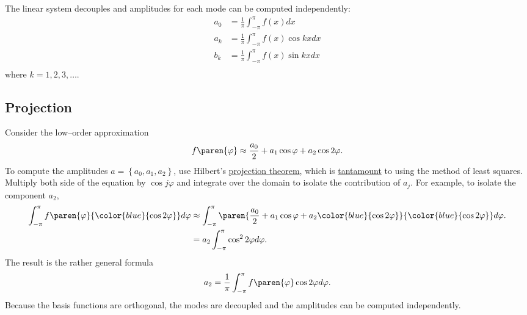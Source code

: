 The linear system decouples and amplitudes for each mode can be computed independently:
\begin{equation}
	\begin{split}
		a_{0} &= \tfrac{1}{\pi} \int_{-\pi}^{\pi} f(x) dx \\
		a_{k} &= \tfrac{1}{\pi} \int_{-\pi}^{\pi} f(x) \cos kx dx \\
		b_{k} &= \tfrac{1}{\pi} \int_{-\pi}^{\pi} f(x) \sin kx dx \\
	\end{split}
\end{equation}
where $k=1,2,3,\dots$.

\subsection{Projection}
Consider the low--order approximation 
%
\begin{equation}
	f\paren{\varphi}  \approx \frac{a_{0}}{2}  + a_{1} \cos \varphi +  a_{2} \cos 2\varphi.
\end{equation}
%
To compute the amplitudes $a=\left\{a_{0}, a_{1}, a_{2} \right\}$, use Hilbert's \href{https://en.wikipedia.org/wiki/Hilbert_projection_theorem}{projection theorem}, which is \href{http://www.kris-nimark.net/pdf/ProjectionTheorem.pdf}{tantamount} to using the method of least squares. Multiply both side of the equation by $\cos j \varphi$ and integrate over the domain to isolate the contribution of $a_{j}$. For example, to isolate the component $a_{2}$,
%
\begin{equation}
	\begin{split}
		\int_{-\pi}^{\pi}{ f\paren{\varphi}  {\color{blue}{\cos 2\varphi }}} d\varphi  
			&\approx \int_{-\pi}^{\pi}{ \paren{\frac{a_{0}}{2}  + a_{1} \cos \varphi +  a_{2} {\color{blue}{\cos 2\varphi}} } {\color{blue}{\cos 2\varphi}}} d\varphi. \\
			&= a_{2} \int_{-\pi}^{\pi}{ \cos^{2} 2\varphi } d\varphi. \\
	\end{split}
\end{equation}
%
The result is the rather general formula
\begin{equation}
	a_{2} = \frac{1}{\pi} \int_{-\pi}^{\pi} f\paren{\varphi} \cos 2\varphi d\varphi.
\end{equation}
Because the basis functions are orthogonal, the modes are decoupled and the amplitudes can be computed independently.

